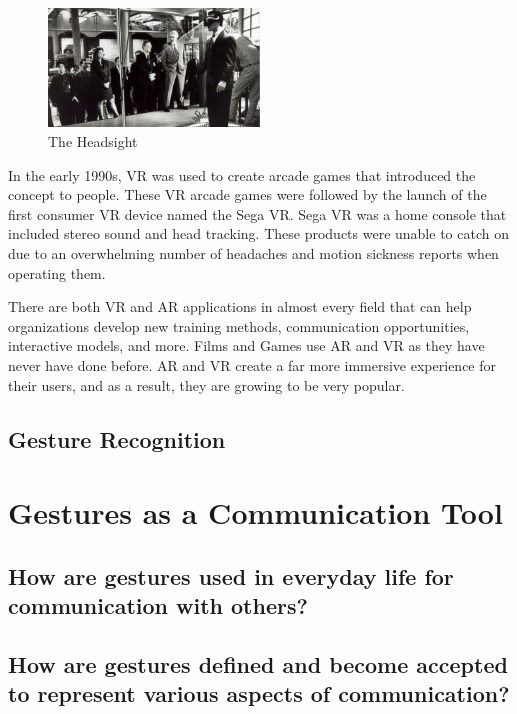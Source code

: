 \documentclass{article}
\begin{document}
\begin{figure}[!ht]
    \caption{The Headsight}
    \label{image:Headsight}
    \centering
    \includegraphics[width=0.5\textwidth]{pics/Headsight.jpg}
\end{figure}

In the early 1990s, VR was used to create arcade games that introduced the concept to people. These VR arcade games were followed by the launch of the first consumer VR device named the Sega VR. Sega VR was a home console that included stereo sound and head tracking. These products were unable to catch on due to an overwhelming number of headaches and motion sickness reports when operating them.

There are both VR and AR applications in almost every field that can help organizations develop new training methods, communication opportunities, interactive models, and more. Films and Games use AR and VR as they have never have done before. AR and VR create a far more immersive experience for their users, and as a result, they are growing to be very popular. 
\cite{ref11}

\subsection{Gesture Recognition}


\section{Gestures as a Communication Tool}

\subsection{How are gestures used in everyday life for communication with others?}
\subsection{How are gestures defined and become accepted to represent various aspects of
communication?}
\end{document}
